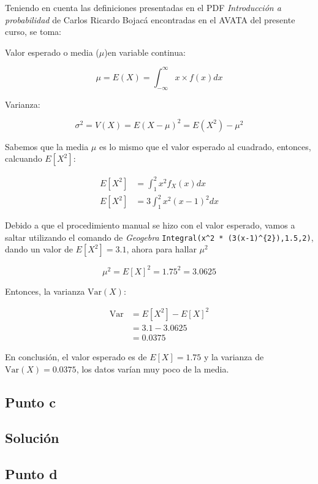 \documentclass[12pt]{article}
\begin{document}
Teniendo en cuenta las definiciones presentadas en el PDF \textit{Introducción a probabilidad} de Carlos Ricardo Bojacá encontradas en el AVATA del presente curso, se toma:

Valor esperado o media ($\mu$)en variable continua:

\[
\mu = E(X) = \int_{-\infty}^{\infty} x \times f(x) dx
\]

Varianza:

\[
\sigma^{2} = V(X) = E(X - \mu)^{2} = E(X^{2}) - \mu^{2}
\]

Sabemos que la media $\mu$ es lo mismo que el valor esperado al cuadrado, entonces, calcuando $E[X^{2}]$:

\begin{align*}
  E[X^{2}] &= \int_{1}^{2} x^{2} f_{X} (x) dx \\
  E[X^{2}] &= 3 \int_{1}^{2} x^{2} (x-1)^{2} dx
\end{align*}

Debido a que el procedimiento manual se hizo con el valor esperado, vamos a saltar utilizando el comando de \textit{Geogebra} \lstinline|Integral(x^2 * (3(x-1)^{2}),1.5,2)|, dando un valor de $E[X^{2}] = 3.1$, ahora para hallar $\mu^{2}$

\[
\mu^{2} = E[X]^{2} = 1.75^{2} = 3.0625
\]

Entonces, la varianza $\mathrm{Var}(X)$:

\begin{align*}
  \mathrm{Var} &= E[X^{2}] - E[X]^{2} \\
               &= 3.1 - 3.0625 \\
               &= 0.0375
\end{align*}

En conclusión, el valor esperado es de $E[X] = 1.75$ y la varianza de $\mathrm{Var}(X) = 0.0375$, los datos varían muy poco de la media.





\subsection{Punto c}
\subsection{Solución}

\subsection{Punto d}
\end{document}
